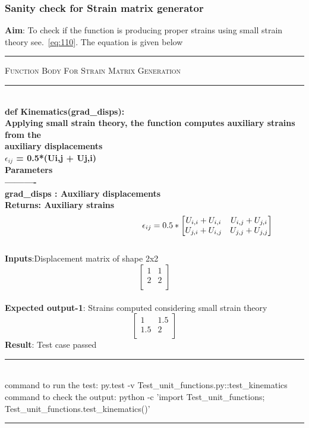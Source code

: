 \documentclass[fleqn, 12.5pt,a4paper]{report}
\begin{document}
\subsubsection{Sanity check for Strain matrix generator}
\textbf{Aim}: To check if the function is producing proper strains using small strain theory see.~\autoref{eq:110}. The equation is given below\newline
{ \rule{\linewidth}{0.05cm}}
	{\scshape Function Body For Strain Matrix Generation}\\
{ \rule{\linewidth}{0.05cm}}
{\selectfont
\\
\textbf{def Kinematics(grad{\_}disps):\\
    Applying small strain theory, the function computes auxiliary strains from the\\ auxiliary displacements\\
    $\epsilon_{ij}$ = 0.5*(Ui,j + Uj,i)\\
    Parameters\\
    ----------\\
    grad{\_}disps : Auxiliary displacements\\
    Returns: Auxiliary strains\\
    }}
\begin{align}\label{eq:110}\hspace{4.5cm}
\epsilon_{ij}  =  0.5 * \begin{bmatrix}
U_{i,i} + U_{i,i} & U_{i,j} + U_{j,i}\\
U_{j,i} + U_{i,j} & U_{j,j} + U_{j,j}\\
\end{bmatrix}
\end{align}
\\
\textbf{Inputs}:Displacement matrix of shape 2x2
$$
 \begin{bmatrix}
1 & 1\\
2 & 2\\
\end{bmatrix}
$$
\\
\textbf{Expected output-1}: Strains computed considering small strain theory
$$
 \begin{bmatrix}
1 & 1.5\\
1.5 & 2\\
\end{bmatrix}
$$
\textbf{Result}: Test case passed
\\
{\rule{\linewidth}{0.02cm}}\\
command to run the test: {\selectfont py.test -v Test{\_}unit{\_}functions.py::test{\_}kinematics}\\
command to check the output: {\selectfont python -c 'import Test{\_}unit{\_}functions;\\
Test{\_}unit{\_}functions.test{\_}kinematics()'}\\
{\rule{\linewidth}{0.02cm}}
\end{document}
